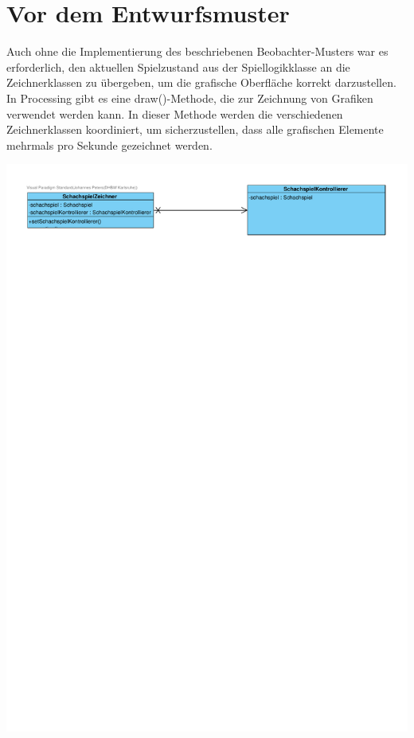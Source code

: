 \newpage

\section{Vor dem Entwurfsmuster}

Auch ohne die Implementierung des beschriebenen Beobachter-Musters war es erforderlich, den aktuellen Spielzustand aus der Spiellogikklasse an die Zeichnerklassen zu übergeben, um die grafische Oberfläche korrekt darzustellen. 
In Processing gibt es eine draw()-Methode, die zur Zeichnung von Grafiken verwendet werden kann. 
In dieser Methode werden die verschiedenen Zeichnerklassen koordiniert, um sicherzustellen, dass alle grafischen Elemente mehrmals pro Sekunde gezeichnet werden.

\begin{minipage}{\linewidth}
    \centering
    \includegraphics[scale=0.75, trim={0 25cm 0 0}]{Bilder/SWE_ohne_Observer.pdf}
\end{minipage}

